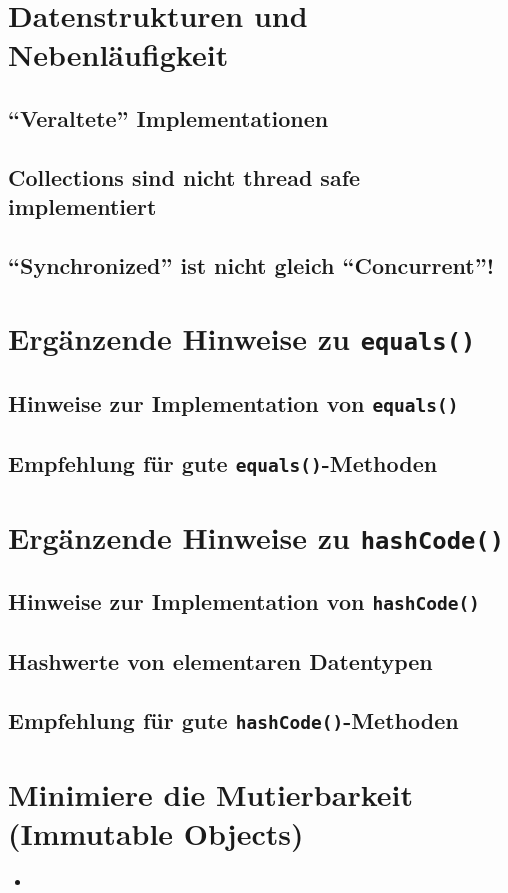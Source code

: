\section{Datenstrukturen und Nebenläufigkeit}
\subsection{"`Veraltete"' Implementationen}
\subsection{Collections sind nicht thread safe implementiert}
\subsection{"`Synchronized"' ist nicht gleich "`Concurrent"'!}

\section{Ergänzende Hinweise zu \texttt{equals()}}
\subsection{Hinweise zur Implementation von \texttt{equals()}}
\subsection{Empfehlung für gute \texttt{equals()}-Methoden}

\section{Ergänzende Hinweise zu \texttt{hashCode()}}
\subsection{Hinweise zur Implementation von \texttt{hashCode()}}
\subsection{Hashwerte von elementaren Datentypen}
\subsection{Empfehlung für gute \texttt{hashCode()}-Methoden}

\section{Minimiere die Mutierbarkeit (Immutable Objects)}
\begin{itemize}
    \item
\end{itemize}
